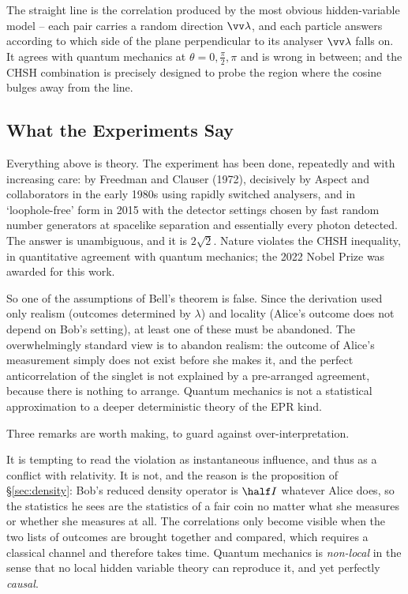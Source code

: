 The straight line is the correlation produced by the most obvious hidden-variable model -- each pair carries a random direction $\vv\lambda$, and each particle answers according to which side of the plane perpendicular to its analyser $\vv\lambda$ falls on. It agrees with quantum mechanics at $\theta = 0, \frac\pi2, \pi$ and is wrong in between; and the CHSH combination is precisely designed to probe the region where the cosine bulges away from the line.

\subsection{What the Experiments Say}

Everything above is theory. The experiment has been done, repeatedly and with increasing care: by Freedman and Clauser (1972), decisively by Aspect and collaborators in the early 1980s using rapidly switched analysers, and in `loophole-free' form in 2015 with the detector settings chosen by fast random number generators at spacelike separation and essentially every photon detected. The answer is unambiguous, and it is $2\sqrt2$. Nature violates the CHSH inequality, in quantitative agreement with quantum mechanics; the 2022 Nobel Prize was awarded for this work.

So one of the assumptions of Bell's theorem is false. Since the derivation used only realism (outcomes determined by $\lambda$) and locality (Alice's outcome does not depend on Bob's setting), at least one of these must be abandoned. The overwhelmingly standard view is to abandon realism: the outcome of Alice's measurement simply does not exist before she makes it, and the perfect anticorrelation of the singlet is not explained by a pre-arranged agreement, because there is nothing to arrange. Quantum mechanics is not a statistical approximation to a deeper deterministic theory of the EPR kind.

Three remarks are worth making, to guard against over-interpretation.

\begin{remark}
    It is tempting to read the violation as instantaneous influence, and thus as a conflict with relativity. It is not, and the reason is the proposition of \S\ref{sec:density}: Bob's reduced density operator is $\half I$ whatever Alice does, so the statistics he sees are the statistics of a fair coin no matter what she measures or whether she measures at all. The correlations only become visible when the two lists of outcomes are brought together and compared, which requires a classical channel and therefore takes time. Quantum mechanics is \emph{non-local} in the sense that no local hidden variable theory can reproduce it, and yet perfectly \emph{causal}.
\end{remark}

